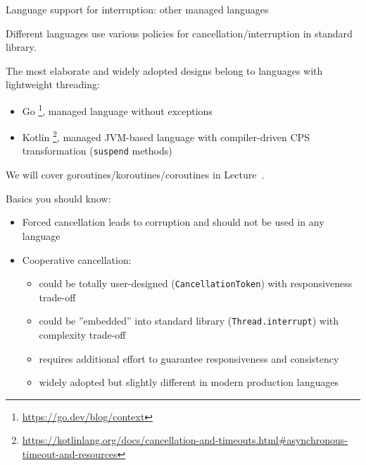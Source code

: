 \begin{frame}[t]{Language support for interruption: other managed languages}

Different languages use various policies for cancellation/interruption in standard library.

\pause

The most elaborate and widely adopted designs belong to languages with lightweight threading:
\begin{itemize}
    \item Go \footnote<2->{\tiny\url{https://go.dev/blog/context}}, managed language without exceptions
    \item Kotlin \footnote<2->{\tiny\url{https://kotlinlang.org/docs/cancellation-and-timeouts.html#asynchronous-timeout-and-resources}}, managed JVM-based language with compiler-driven CPS transformation (\texttt{suspend} methods)
\end{itemize}

\pause

We will cover goroutines/koroutines/coroutines in Lecture~\userSpaceThreadingNum.

\pause

Basics you should know:
\begin{itemize}
    \item Forced cancellation leads to corruption and should not be used in any language
    \item Cooperative cancellation:
    \begin{itemize}
      \item could be totally user-designed (\texttt{CancellationToken}) with responsiveness trade-off
      \item could be ''embedded'' into standard library (\texttt{Thread.interrupt}) with complexity trade-off
      \item requires additional effort to guarantee responsiveness and consistency
      \item widely adopted but slightly different in modern production languages
    \end{itemize}
\end{itemize}
\end{frame}


